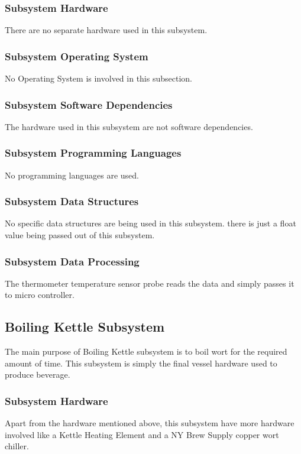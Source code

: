 \subsubsection{Subsystem Hardware}
There are no separate hardware used in this subsystem.

\subsubsection{Subsystem Operating System}
No Operating System is involved in this subsection.

\subsubsection{Subsystem Software Dependencies}
The hardware used in this subsystem are not software dependencies.

\subsubsection{Subsystem Programming Languages}
No programming languages are used.

\subsubsection{Subsystem Data Structures}
No specific data structures are being used in this subsystem. there is just a float value being passed out of this subsystem.

\subsubsection{Subsystem Data Processing}
The thermometer temperature sensor probe reads the data and simply passes it to micro controller. \newline


\subsection{Boiling Kettle Subsystem}
The main purpose of Boiling Kettle subsystem is to boil wort for the required amount of time. This subsystem is simply the final vessel hardware used to produce beverage.

\subsubsection{Subsystem Hardware}
Apart from the hardware mentioned above, this subsystem have more hardware involved like a Kettle Heating Element and a NY Brew Supply copper wort chiller.


